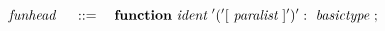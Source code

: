 \[
	~\emph{funhead}~ \quad ::= \quad
		\textbf{function} ~\emph{ident}~ '(' [~\emph{paralist}~] ')': ~\emph{basictype}~;
\]